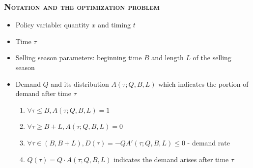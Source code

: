 \documentclass[aspectratio=169]{../presentation}
\begin{document}
    \begin{frame}
        \frametitle{\textsc{Notation and the optimization problem}}

        \begin{itemize}
            \item Policy variable: quantity $x$ and timing $t$
            \item Time $\tau$
            \item Selling season parameters: beginning time $B$ and length $L$ of the selling season
            \item Demand $Q$ and its distribution $A(\tau; Q, B, L)$ which indicates the portion of demand after time $\tau$
            \pause
            \begin{enumerate}
                \item $\forall \tau \leq B, A(\tau; Q, B, L) = 1$
                \item $\forall \tau \geq B + L, A(\tau; Q, B, L) = 0$
                \item $\forall \tau \in (B, B+L), D(\tau) = -QA'(\tau; Q, B, L) \leq 0$ - demand rate
                \item $Q(\tau) = Q\cdot A(\tau; Q, B, L)$ indicates the demand arises after time $\tau$
            \end{enumerate}
        \end{itemize}

    \end{frame}
\end{document}
